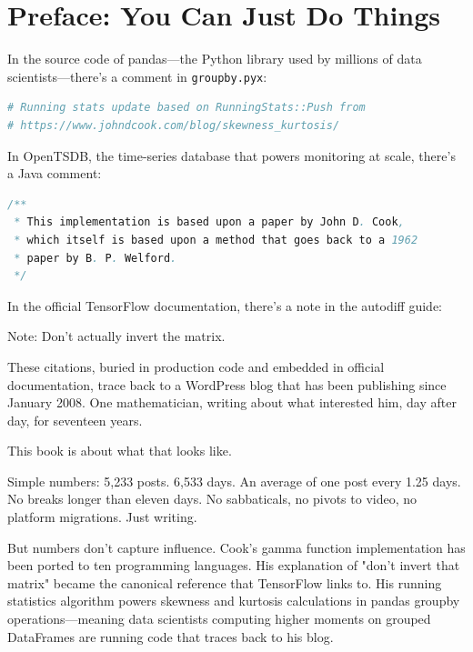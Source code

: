 \chapter*{Preface: You Can Just Do Things}

In the source code of pandas---the Python library used by millions of data scientists---there's a comment in \texttt{groupby.pyx}:

\begin{lstlisting}[language=python]
# Running stats update based on RunningStats::Push from
# https://www.johndcook.com/blog/skewness_kurtosis/
\end{lstlisting}

In OpenTSDB, the time-series database that powers monitoring at scale, there's a Java comment:

\begin{lstlisting}[language=java]
/**
 * This implementation is based upon a paper by John D. Cook,
 * which itself is based upon a method that goes back to a 1962
 * paper by B. P. Welford.
 */
\end{lstlisting}

In the official TensorFlow documentation, there's a note in the autodiff guide:

\begin{blogquote}
Note: Don't actually invert the matrix.
\end{blogquote}

These citations, buried in production code and embedded in official documentation, trace back to a WordPress blog that has been publishing since January 2008. One mathematician, writing about what interested him, day after day, for seventeen years.

This book is about what that looks like.

\bigskip

Simple numbers: 5,233 posts. 6,533 days. An average of one post every 1.25 days. No breaks longer than eleven days. No sabbaticals, no pivots to video, no platform migrations. Just writing.

But numbers don't capture influence. Cook's gamma function implementation has been ported to ten programming languages. His explanation of "don't invert that matrix" became the canonical reference that TensorFlow links to. His running statistics algorithm powers skewness and kurtosis calculations in pandas groupby operations---meaning data scientists computing higher moments on grouped DataFrames are running code that traces back to his blog.

